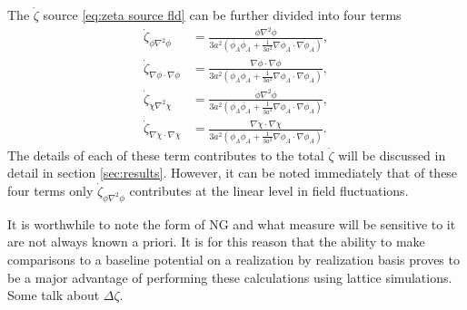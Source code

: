 The $\dot{\zeta}$ source \eqref{eq:zeta source fld} can be further divided into four terms
\begin{align}
  \dot{\zeta}_{\dot{\phi}\nabla^2\phi} & = \frac{\dot{\phi}\nabla^2\phi}{3a^2(\dot{\phi_A}\dot{\phi_A} +\frac{1}{3a^2}\nabla\phi_A\cdot\nabla\phi_A)}, \\
  \dot{\zeta}_{\nabla\dot{\phi}\cdot\nabla\phi} & = \frac{\nabla\dot{\phi}\cdot\nabla\phi}{3a^2(\dot{\phi_A}\dot{\phi_A} +\frac{1}{3a^2}\nabla\phi_A\cdot\nabla\phi_A)}, \\
  \dot{\zeta}_{\dot{\chi}\nabla^2\chi} & = \frac{\dot{\phi}\nabla^2\phi}{3a^2(\dot{\phi_A}\dot{\phi_A} +\frac{1}{3a^2}\nabla\phi_A\cdot\nabla\phi_A)}, \\
  \dot{\zeta}_{\nabla\dot{\chi}\cdot\nabla\chi} & = \frac{\nabla\dot{\chi}\cdot\nabla\chi}{3a^2(\dot{\phi_A}\dot{\phi_A} +\frac{1}{3a^2}\nabla\phi_A\cdot\nabla\phi_A)}.
\end{align}
The details of each of these term contributes to the total $\dot{\zeta}$ will be discussed in detail in section \ref{sec:results}.
However, it can be noted immediately that of these four terms only $\dot{\zeta}_{\dot{\phi}\nabla^2\phi}$ contributes at the linear level in field fluctuations. %

It is worthwhile to note the form of NG and what measure will be sensitive to it are not always known a priori.
It is for this reason that the ability to make comparisons to a baseline potential on a realization by realization basis proves to be a major advantage of performing these calculations using lattice simulations.
Some talk about $\Delta\zeta$.
